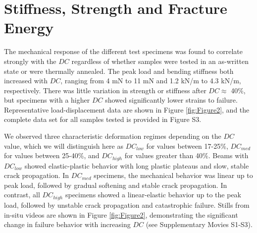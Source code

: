 \documentclass[11pt]{article}
\providecommand{\DC}[0]{$DC$}
\providecommand{\DClow}[0]{$DC_{low}$}
\providecommand{\DCmed}[0]{$DC_{med}$}
\providecommand{\DChi}[0]{$DC_{high}$}
\begin{document}
    \section{Stiffness, Strength and Fracture Energy}
        The mechanical response of the different test specimens was found to correlate strongly with the \DC{} regardless of whether samples were tested in an as-written state or were thermally annealed. 
        The peak load and bending stiffness both increased with \DC{}, ranging from 4 mN to 11 mN and 1.2 kN/m to 4.3 kN/m, respectively.
        There was little variation in strength or stiffness after $DC\approx$ 40\%, but specimens with a higher \DC{} showed significantly lower strains to failure.
        Representative load-displacement data are shown in Figure \ref{fig:Figure2}, and the complete data set for all samples tested is provided in Figure S3.

        We observed three characteristic deformation regimes depending on the \DC{} value, which we will distinguish here as \DClow{} for values between 17-25\%, \DCmed{} for values between 25-40\%, and \DChi{} for values greater than 40\%.
        Beams with \DClow{} showed elastic-plastic behavior with long plastic plateaus and slow, stable crack propagation.
        In \DCmed{} specimens, the mechanical behavior was linear up to peak load, followed by gradual softening and stable crack propagation. 
        In contrast, all \DChi{} specimens showed a linear-elastic behavior up to the peak load, followed by unstable crack propagation and catastrophic failure. 
        Stills from in-situ videos are shown in Figure \ref{fig:Figure2}, demonstrating the significant change in failure behavior with increasing \DC{} (see Supplementary Movies S1-S3).
\end{document}
